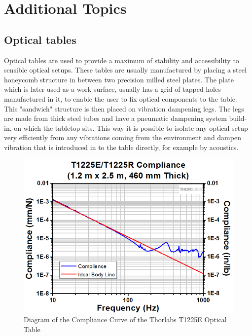 \chapter{Additional Topics}
\label{AppendixAdditionalTopics}

\section{Optical tables}
Optical tables are used to provide a maximum of stability and accessibility to sensible optical setups. These tables are usually manufactured by placing a steel honeycomb structure in between two precision milled steel plates. The plate which is later used as a work surface, usually has a grid of tapped holes manufactured in it, to enable the user to fix optical components to the table. This "sandwich" structure is then placed on vibration dampening legs. The legs are made from thick steel tubes and have a pneumatic dampening system build-in, on which the tabletop sits. This way it is possible to isolate any optical setup very efficiently from any vibrations coming from the environment and dampen vibration that is introduced in to the table directly, for example by acoustics.\\

\begin{figure}[h!]
\begin{center}
\includegraphics[width=12cm]{Pictures/OpticalTableCompliance}
\caption[Diagram of the Compliance Curve of the Thorlabs T1225E Optical Table]{Diagram of the Compliance Curve of the Thorlabs T1225E Optical Table\cite{ThorlabsComplianceOpticalTable}}
\label{OpticalTableCompliance}
\end{center}
\end{figure}

